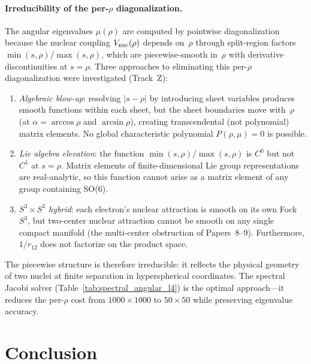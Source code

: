 \documentclass[aps,pra,twocolumn,superscriptaddress,longbibliography]{revtex4-2}
\begin{document}
\paragraph{Irreducibility of the per-$\rho$ diagonalization.}
The angular eigenvalues $\mu(\rho)$ are computed by pointwise
diagonalization because the nuclear coupling $V_{\rm nuc}(\rho)$
depends on~$\rho$ through split-region factors
$\min(s,\rho)/\max(s,\rho)$, which are piecewise-smooth in~$\rho$
with derivative discontinuities at $s = \rho$.  Three approaches
to eliminating this per-$\rho$ diagonalization were investigated
(Track~Z):
\begin{enumerate}
  \item \emph{Algebraic blow-up}: resolving $|s - \rho|$ by
    introducing sheet variables produces smooth functions within
    each sheet, but the sheet boundaries move with~$\rho$ (at
    $\alpha = \arccos\rho$ and $\arcsin\rho$), creating
    transcendental (not polynomial) matrix elements.  No global
    characteristic polynomial $P(\rho,\mu) = 0$ is possible.
  \item \emph{Lie algebra elevation}: the function
    $\min(s,\rho)/\max(s,\rho)$ is $C^0$ but not~$C^1$ at $s = \rho$.
    Matrix elements of finite-dimensional Lie group representations
    are real-analytic, so this function cannot arise as a matrix
    element of any group containing SO(6).
  \item \emph{$S^3 \times S^3$ hybrid}: each electron's nuclear
    attraction is smooth on its own Fock $S^3$, but two-center
    nuclear attraction cannot be smooth on any single compact manifold
    (the multi-center obstruction of Papers~8--9).  Furthermore,
    $1/r_{12}$ does not factorize on the product space.
\end{enumerate}
The piecewise structure is therefore irreducible: it reflects the
physical geometry of two nuclei at finite separation in
hyperspherical coordinates.  The spectral Jacobi solver
(Table~\ref{tab:spectral_angular_l4}) is the optimal approach---it
reduces the per-$\rho$ cost from $1000 \times 1000$ to
$50 \times 50$ while preserving eigenvalue accuracy.

\section{Conclusion}
\label{sec:conclusion}
\end{document}
